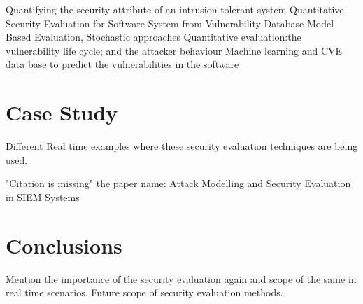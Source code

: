 \documentclass[pdftex,english,oribibl]{llncs}
\begin{document}
  	Quantifying the security attribute of an intrusion tolerant system\cite{1028941}\newline
  	Quantitative Security Evaluation for Software System from Vulnerability Database\cite{Okamura:2013:QSESVD}\newline
 	Model Based Evaluation, Stochastic approaches\cite{1335467}\newline
  	Quantitative evaluation:the vulnerability life cycle; and the attacker behaviour\cite{5315969}\newline
  	Machine learning and CVE data base to predict the vulnerabilities in the software\cite{Jain:2017:CAE:3102980.3102991}\newline
  	
\section{Case Study}
Different Real time examples where these security evaluation techniques are being used.\newline

	\cite{Kotenko}\newline
	"Citation is missing" the paper name: Attack Modelling and Security Evaluation in SIEM Systems\newline
	
\section{Conclusions}\label{sec:conclusions}
Mention the importance of the security evaluation again and scope of the same in real time scenarios.
Future scope of security evaluation methods.


\end{document}
